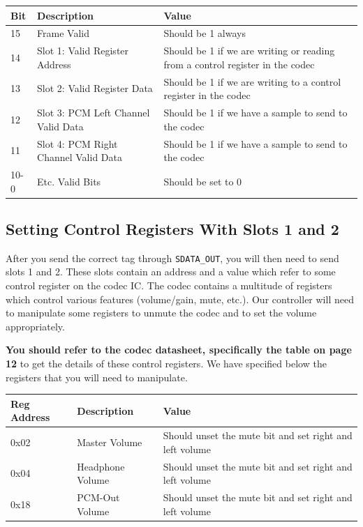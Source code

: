 \documentclass[11pt]{article}
\begin{document}
\renewcommand{\arraystretch}{1.1}
\begin{center}
	\begin{tabular}{ | l | l | p{8cm} |}
		\hline
		\textbf{Bit} & \textbf{Description} & \textbf{Value} \\ \hline
		15 & Frame Valid & Should be 1 always  \\ \hline
		14 & Slot 1: Valid Register Address & Should be 1 if we are writing or reading from a control register in the codec  \\ \hline
		13 & Slot 2: Valid Register Data & Should be 1 if we are writing to a control register in the codec \\ \hline
		12 & Slot 3: PCM Left Channel Valid Data & Should be 1 if we have a sample to send to the codec  \\ \hline
		11 & Slot 4: PCM Right Channel Valid Data & Should be 1 if we have a sample to send to the codec  \\ \hline
		10-0 & Etc. Valid Bits & Should be set to 0 \\ \hline		
	\end{tabular}
\end{center}

\subsection{Setting Control Registers With Slots 1 and 2}
After you send the correct tag through \verb|SDATA_OUT|, you will then need to send slots 1 and 2. These slots contain an address and a value which refer to some control register on the codec IC. The codec contains a multitude of registers which control various features (volume/gain, mute, etc.). Our controller will need to manipulate some registers to unmute the codec and to set the volume appropriately.

\textbf{You should refer to the codec datasheet, specifically the table on page 12} to get the details of these control registers. We have specified below the registers that you will need to manipulate.

\begin{center}
	\begin{tabular}{ | l | l | p{10cm} |}
		\hline
		\textbf{Reg Address} & \textbf{Description} & \textbf{Value} \\ \hline
		0x02 & Master Volume & Should unset the mute bit and set right and left volume \\ \hline
		0x04 & Headphone Volume & Should unset the mute bit and set right and left volume \\ \hline
		0x18 & PCM-Out Volume & Should unset the mute bit and set right and left volume \\ \hline
	\end{tabular}
\end{center}
\end{document}
